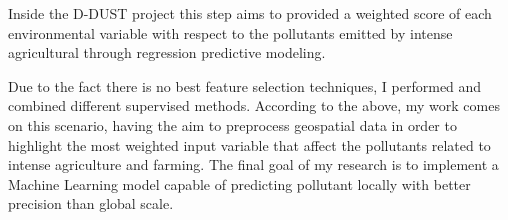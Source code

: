 \bigbreak
Inside the D-DUST project this step aims to provided a weighted score of each environmental variable with respect to the pollutants emitted by intense agricultural through regression predictive modeling.\newline
\par
Due to the fact there is no best feature selection techniques, I performed and combined different supervised methods. 
\bigbreak
According to the above, my work comes on this scenario, having the aim to preprocess geospatial data in order to highlight the most weighted input variable that affect the pollutants related to intense agriculture and farming.\newline
The final goal of my research is to implement a Machine Learning model capable of predicting pollutant locally with better precision than global scale. 




